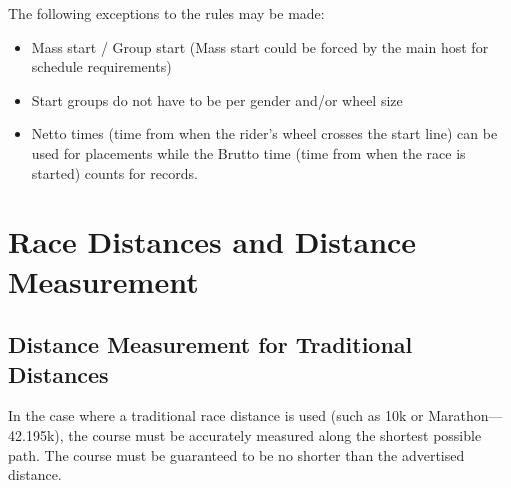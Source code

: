 The following exceptions to the rules may be made:
\begin{itemize}
\item Mass start / Group start (Mass start could be forced by the main host for schedule requirements) 
\item Start groups do not have to be per gender and/or wheel size
\item Netto times (time from when the rider's wheel crosses the start line) can be used for placements while the Brutto time (time from when the race is started) counts for records.
\end{itemize}

\section{Race Distances and Distance Measurement}

\subsection {Distance Measurement for Traditional Distances}

In the case where a traditional race distance is used (such as 10k or Marathon---42.195k), the course must be accurately measured along the shortest possible path.
The course must be guaranteed to be no shorter than the advertised distance.

